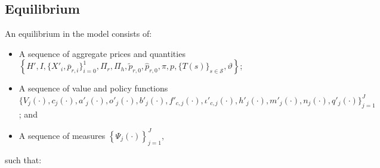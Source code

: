 \documentclass[parskip=full]{article}
\begin{document}
\subsection{Equilibrium}
An equilibrium in the model consists of: 
\begin{itemize}
    \item A sequence of aggregate prices and quantities
    $\left\{H',I,\{X'_{i}, \overline{p}_{r,i} \}^{1}_{i=0},\Pi_r,\Pi_h,\tilde{p}_{r,0},\hat{p}_{r,0},\pi,p,\{T(s)\}_{s \in \mathcal{S}},\vartheta\right\}$;
    \item A sequence of value and policy functions
    $\biggl\{V_{j}(\cdot),c_{j}(\cdot),a'_{j}(\cdot),o'_{j}(\cdot),b'_{j}(\cdot),f'_{c,j}(\cdot),\iota'_{c,j}(\cdot),h'_{j}(\cdot),m'_{j}(\cdot),n_{j}(\cdot),q'_{j}(\cdot)\biggl\}_{j=1}^J$; and
    \item A sequence of measures 
     $\left\{\Psi_{j}(\cdot)\right\}_{j=1}^J$,
\end{itemize}
\noindent such that:
\end{document}
